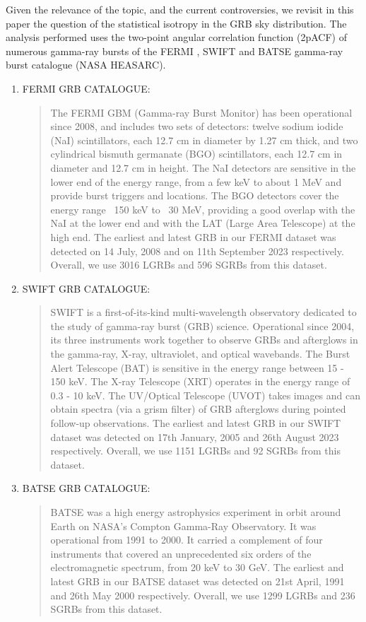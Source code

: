 \documentclass[12pt]{article}
\begin{document}
Given the relevance of the topic, and the current controversies, we
revisit in this paper the question of the statistical isotropy in the
GRB sky distribution. The analysis performed uses the two-point angular
correlation function (2pACF) of numerous gamma-ray bursts of the FERMI \cite{von2020fourth} \cite{gruber2014fermi},
SWIFT \cite{SWIFT} and BATSE gamma-ray burst catalogue (NASA HEASARC).
\newline
\newpage
\begin{enumerate}
\def\labelenumi{\Roman{enumi}.}
\item
  FERMI GRB CATALOGUE:
  \begin{quote}
      The FERMI GBM (Gamma-ray Burst Monitor) has been operational since 2008, and includes two sets of detectors: twelve sodium iodide (NaI) scintillators, each 12.7 cm in diameter by 1.27 cm thick, and two cylindrical bismuth germanate (BGO) scintillators, each 12.7 cm in diameter and 12.7 cm in height. The NaI detectors are sensitive in the lower end of the energy range, from a few keV to about 1 MeV and provide burst triggers and locations. The BGO detectors cover the energy range ~150 keV to ~30 MeV, providing a good overlap with the NaI at the lower end and with the LAT (Large Area Telescope) at the high end.
      The earliest and latest GRB in our FERMI dataset was detected on 14 July, 2008 and on 11th September 2023 respectively. Overall, we use 3016 LGRBs and 596 SGRBs from this dataset.
  \end{quote}
  \hfill\break
\item
SWIFT GRB CATALOGUE:
\begin{quote}
    SWIFT is a first-of-its-kind multi-wavelength observatory dedicated to the study of gamma-ray burst (GRB) science. Operational since 2004, its three instruments work together to observe GRBs and afterglows in the gamma-ray, X-ray, ultraviolet, and optical wavebands. The Burst Alert Telescope (BAT) is sensitive in the energy range between 15 - 150 keV. The X-ray Telescope (XRT) operates in the energy range of 0.3 - 10 keV. The UV/Optical Telescope (UVOT) takes images and can obtain spectra (via a grism filter) of GRB afterglows during pointed follow-up observations. 
    The earliest and latest GRB in our SWIFT dataset was detected on 17th January, 2005 and 26th August 2023 respectively. Overall, we use 1151 LGRBs and 92 SGRBs from this dataset.
\end{quote}
\hfill \break
\item 
BATSE GRB CATALOGUE:
\begin{quote}
    BATSE was a high energy astrophysics experiment in orbit around Earth on NASA's Compton Gamma-Ray Observatory. It was operational from 1991 to 2000. It carried a complement of four instruments that covered an unprecedented six orders of the electromagnetic spectrum, from 20 keV to 30 GeV. The earliest and latest GRB in our BATSE dataset was detected on 21st April, 1991 and 26th May 2000 respectively. Overall, we use 1299 LGRBs and 236 SGRBs from this dataset.
\end{quote}
\end{enumerate}
\end{document}
